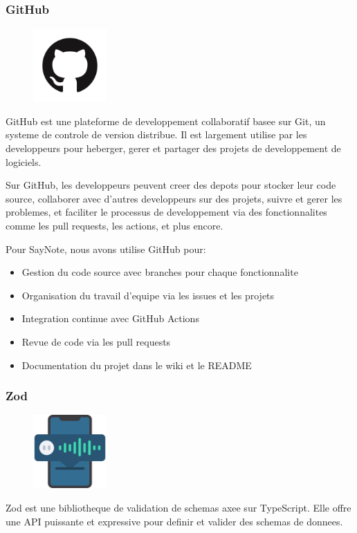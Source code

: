 \subsubsection{GitHub}
\begin{figure}
    \centering
    \includegraphics[width=0.25\textwidth]{assets/docs/github.png}
\end{figure}
GitHub est une plateforme de developpement collaboratif basee sur Git, un systeme de controle de version distribue. Il est largement utilise par les developpeurs pour heberger, gerer et partager des projets de developpement de logiciels.

Sur GitHub, les developpeurs peuvent creer des depots pour stocker leur code source, collaborer avec d'autres developpeurs sur des projets, suivre et gerer les problemes, et faciliter le processus de developpement via des fonctionnalites comme les pull requests, les actions, et plus encore.

Pour SayNote, nous avons utilise GitHub pour:
\begin{itemize}
    \item Gestion du code source avec branches pour chaque fonctionnalite
    \item Organisation du travail d'equipe via les issues et les projets
    \item Integration continue avec GitHub Actions
    \item Revue de code via les pull requests
    \item Documentation du projet dans le wiki et le README
\end{itemize}



\subsubsection{Zod}
\begin{figure}
    \centering
    \includegraphics[width=0.25\textwidth]{assets/docs/logo_zod.png}
\end{figure}
Zod est une bibliotheque de validation de schemas axee sur TypeScript. Elle offre une API puissante et expressive pour definir et valider des schemas de donnees. 

